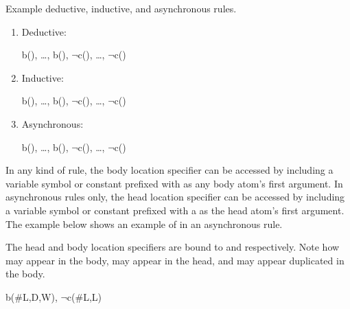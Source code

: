 \begin{example}
Example deductive, inductive, and asynchronous rules.
\begin{enumerate}

\item Deductive:

\begin{Drules}
        {b(), \ldots, b(), $\lnot$c(), \ldots, $\lnot$c()}
\end{Drules}

\item Inductive:

\begin{Drules}
        {b(), \ldots, b(), $\lnot$c(), \ldots, $\lnot$c()}
\end{Drules}

\item Asynchronous:

\begin{Drules}
        {b(), \ldots, b(), $\lnot$c(), \ldots, $\lnot$c()}
\end{Drules}
\end{enumerate}
\end{example}

In any kind of rule, the body location specifier can be accessed by including a variable symbol
or constant prefixed with \dedalus{#} as any body atom's first argument.  In
asynchronous rules only, the head location specifier can be accessed by
including a variable symbol or constant prefixed with a \dedalus{#} as the head
atom's first argument.  The example below shows an example of \dedalus{#} in an asynchronous rule.

\begin{example}
The head and body location specifiers are bound to  and  respectively.  Note how  may appear in the body,  may appear in the head, and  may appear duplicated in the body.

\begin{Drules}
        {b(#L,D,W), $\lnot$c(#L,L)}
\end{Drules}
\end{example}

